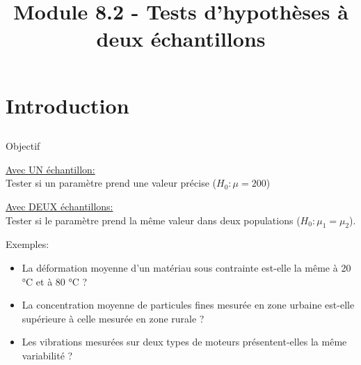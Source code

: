 \documentclass{BeamerTemplate}
\title{Module 8.2 - Tests d'hypothèses à deux échantillons}
\begin{document}
\begin{frame}[t]
  \titlepage
\end{frame}







\section[Intro]{Introduction}

\subsection*{ }

\begin{frame}[t]{Objectif}

\underline{Avec UN échantillon:}\\
Tester si un paramètre prend une valeur précise  ($H_0:\mu=200$)\\

\medskip

\underline{Avec DEUX échantillons:}\\
 \alert{Tester si  le paramètre prend la même valeur dans deux populations} ($H_0:\mu_1=\mu_2$).

\bigskip
Exemples:
    \begin{itemize}
    \item La déformation moyenne d’un matériau sous contrainte est-elle la même à 20 °C et à 80 °C ?
    \item La concentration moyenne de particules fines mesurée en zone urbaine est-elle supérieure à celle mesurée en zone rurale ?
    \item Les vibrations mesurées sur deux types de moteurs présentent-elles la même variabilité ?
    \end{itemize}
\end{frame}
\end{document}
